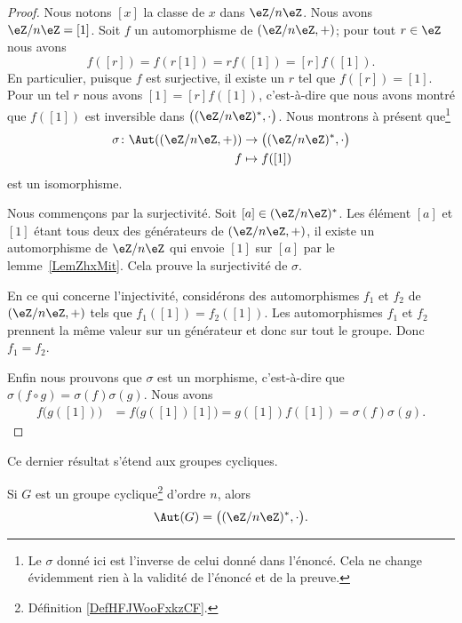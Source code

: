 \begin{proof}
	Nous notons \( [x]\) la classe de \( x\) dans \( \eZ/n\eZ\). Nous avons \( \eZ/n\eZ=[1]\). Soit \( f\) un automorphisme de \( (\eZ/n\eZ,+)\); pour tout \( r\in \eZ\) nous avons
	\begin{equation}
		f([r])=f(r[1])=rf([1])=[r]f([1]).
	\end{equation}
	En particulier, puisque \( f\) est surjective, il existe un \( r\) tel que \( f([r])=[1]\). Pour un tel \( r\) nous avons \( [1]=[r]f([1])\), c'est-à-dire que nous avons montré que \( f([1])\) est inversible dans \(  \big( (\eZ/n\eZ)^*,\cdot\big)\). Nous montrons à présent que\footnote{Le \( \sigma\) donné ici est l'inverse de celui donné dans l'énoncé. Cela ne change évidemment rien à la validité de l'énoncé et de la preuve.}
	\begin{equation}
		\begin{aligned}
			\sigma\colon \Aut( (\eZ/n\eZ,+)) & \to \big( (\eZ/n\eZ)^*,\cdot \big) \\
			f                                & \mapsto f([1])
		\end{aligned}
	\end{equation}
	est un isomorphisme.

	Nous commençons par la surjectivité. Soit \( [a]\in (\eZ/n\eZ)^*\). Les élément \( [a]\) et \( [1]\) étant tous deux des générateurs de \( (\eZ/n\eZ,+)\), il existe un automorphisme de \( \eZ/n\eZ\) qui envoie \( [1]\) sur \( [a]\) par le lemme~\ref{LemZhxMit}. Cela prouve la surjectivité de \( \sigma\).

	En ce qui concerne l'injectivité, considérons des automorphismes \( f_1\) et \( f_2\) de \( (\eZ/n\eZ,+)\) tels que \( f_1([1])=f_2([1])\). Les automorphismes \( f_1\) et \( f_2\) prennent la même valeur sur un générateur et donc sur tout le groupe. Donc \( f_1=f_2\).

	Enfin nous prouvons que \( \sigma\) est un morphisme, c'est-à-dire que \( \sigma(f\circ g)=\sigma(f)\sigma(g)\). Nous avons
	\begin{subequations}
		\begin{align}
			f\big( g([1]) \big) & =f\big( g([1])[1] \big)=g([1])f([1])=\sigma(f)\sigma(g).
		\end{align}
	\end{subequations}
\end{proof}

Ce dernier résultat s'étend aux groupes cycliques.
\begin{proposition}     \label{PROPooBZOMooVOHoYf}
	Si \( G\) est un groupe cyclique\footnote{Définition \ref{DefHFJWooFxkzCF}.} d'ordre \( n\), alors
	\begin{equation}
		\Aut(G)=\big( (\eZ/n\eZ)^*,\cdot\big).
	\end{equation}
\end{proposition}

